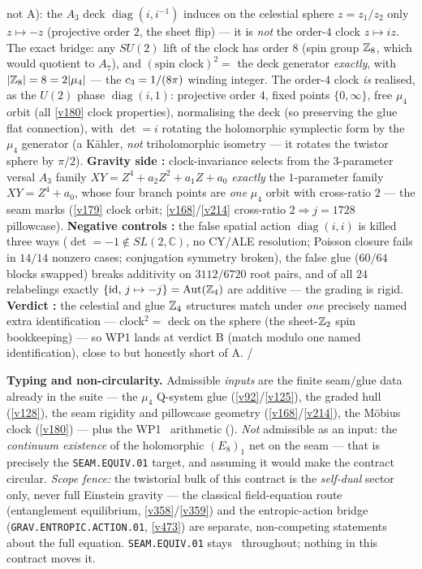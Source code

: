 \begin{keybox}
{not A):} the $A_3$ deck $\operatorname{diag}(i,i^{-1})$ induces on the celestial sphere $z=z_1/z_2$ only
$z\mapsto-z$ (projective order $2$, the sheet flip) --- it is \emph{not} the order-$4$ clock $z\mapsto iz$.
The exact bridge: any $SU(2)$ lift of the clock has order $8$ (spin group $\mathbb Z_8$, which would quotient to
$A_7$), and $(\text{spin clock})^2=$ the deck generator \emph{exactly}, with $|\mathbb Z_8|=8=2|\mu_4|$ --- the
$c_3=1/(8\pi)$ winding integer. The order-$4$ clock \emph{is} realised, as the $U(2)$ phase
$\operatorname{diag}(i,1)$: projective order $4$, fixed points $\{0,\infty\}$, free $\mu_4$ orbit (all
\vref{v180} clock properties), normalising the deck (so preserving the glue flat connection), with
$\det=i$ rotating the holomorphic symplectic form by the $\mu_4$ generator (a K\"ahler, \emph{not}
triholomorphic isometry --- it rotates the twistor sphere by $\pi/2$). \textbf{Gravity side \mE:}
clock-invariance selects from the $3$-parameter versal $A_3$ family $XY=Z^4{+}a_2Z^2{+}a_1Z{+}a_0$
\emph{exactly} the $1$-parameter family $XY=Z^4{+}a_0$, whose four branch points are \emph{one} $\mu_4$
orbit with cross-ratio $2$ --- the seam marks (\vref{v179} clock orbit; \vref{v168}/\vref{v214}
cross-ratio $2\Rightarrow j{=}1728$ pillowcase). \textbf{Negative controls \mE:} the false spatial action
$\operatorname{diag}(i,i)$ is killed three ways ($\det=-1\notin SL(2,\mathbb C)$, no CY/ALE resolution;
Poisson closure fails in $14/14$ nonzero cases; conjugation symmetry broken), the false glue ($60/64$
blocks swapped) breaks additivity on $3112/6720$ root pairs, and of all $24$ relabelings exactly
$\{\mathrm{id},\,j\mapsto-j\}=\operatorname{Aut}(\mathbb Z_4)$ are additive --- the grading is rigid.
\textbf{Verdict \mC:} the celestial and glue $\mathbb Z_4$ structures match under \emph{one} precisely named
extra identification --- clock$^2=$ deck on the sphere (the sheet-$\mathbb Z_2$ spin bookkeeping) --- so WP1
lands at verdict B (match modulo one named identification), close to but honestly short of A. \mE/\mC
\end{keybox}

\par\smallskip\noindent\textbf{Typing and non-circularity.} Admissible \emph{inputs} are the finite
seam/glue data already in the suite --- the $\mu_4$ Q-system glue (\vref{v92}/\vref{v125}), the graded hull
(\vref{v128}), the seam rigidity and pillowcase geometry (\vref{v168}/\vref{v214}), the M\"obius clock
(\vref{v180}) --- plus the WP1 \mE\ arithmetic (). \emph{Not}
admissible as an input: the \emph{continuum existence} of the holomorphic $(E_8)_1$ net on the seam ---
that is precisely the \texttt{SEAM.EQUIV.01} target, and assuming it would make the contract circular.
\emph{Scope fence:} the twistorial bulk of this contract is the \emph{self-dual} sector only, never full
Einstein gravity --- the classical field-equation route (entanglement equilibrium, \vref{v358}/\vref{v359})
and the entropic-action bridge (\texttt{GRAV.ENTROPIC.ACTION.01}, \vref{v473}) are separate, non-competing
statements about the full equation. \texttt{SEAM.EQUIV.01} stays \mO\ throughout; nothing in this contract
moves it.

